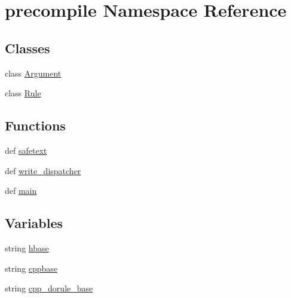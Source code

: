 \hypertarget{namespaceprecompile}{\section{precompile Namespace Reference}
\label{namespaceprecompile}
}
\subsection*{Classes}
\begin{DoxyCompactItemize}
\item 
class \hyperlink{classprecompile_1_1_argument}{Argument}
\item 
class \hyperlink{classprecompile_1_1_rule}{Rule}
\end{DoxyCompactItemize}
\subsection*{Functions}
\begin{DoxyCompactItemize}
\item 
def \hyperlink{namespaceprecompile_addd9f61dbf0e623d070597812399f6a7}{safetext}
\item 
def \hyperlink{namespaceprecompile_a4e61ae1ed52408a8e5d52d59a4b1ab6d}{write\-\_\-dispatcher}
\item 
def \hyperlink{namespaceprecompile_ac67357c475053dc30e9fc5ac393c5165}{main}
\end{DoxyCompactItemize}
\subsection*{Variables}
\begin{DoxyCompactItemize}
\item 
string \hyperlink{namespaceprecompile_a915445fe95e0ce576375efaa28f9e9cf}{hbase}
\item 
string \hyperlink{namespaceprecompile_addc48dfad488613fed77b317717bd97b}{cppbase}
\item 
string \hyperlink{namespaceprecompile_a2f94726aab8db781d7b05ebe57c45b15}{cpp\-\_\-dorule\-\_\-base}
\end{DoxyCompactItemize}


